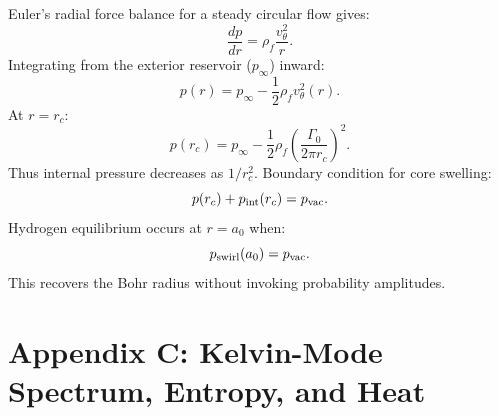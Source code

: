 \documentclass[11pt]{article}
\newcommand{\rhof}{\rho_{\!f}} \newcommand{\rhoF}{\rho_{\!f}}                             %
\newcommand{\rc}{r_c}                                    %
\begin{document}
        Euler’s radial force balance for a steady circular flow gives:
        \begin{equation}
            \frac{dp}{dr} = \rhof \frac{v_\theta^2}{r}.
        \end{equation}
        Integrating from the exterior reservoir ($p_\infty$) inward:
        \begin{equation}
            p(r) = p_\infty - \frac12 \rhof v_\theta^2(r).
        \end{equation}
        At $r = \rc$:
        \begin{equation}
            p(\rc)
            = p_\infty
            - \frac12 \rhof \left( \frac{\Gamma_0}{2\pi \rc} \right)^2.
        \end{equation}
        Thus internal pressure decreases as $1/\rc^2$.
        Boundary condition for core swelling:
        \begin{equation}
            p(\rc) + p_{\rm int}(\rc) = p_{\rm vac}.
        \end{equation}
        Hydrogen equilibrium occurs at $r = a_0$ when:
        \begin{equation}
            p_{\rm swirl}(a_0)
            = p_{\rm vac}.
        \end{equation}
        This recovers the Bohr radius without invoking probability amplitudes.

    \section*{Appendix C: Kelvin-Mode Spectrum, Entropy, and Heat}
\end{document}
